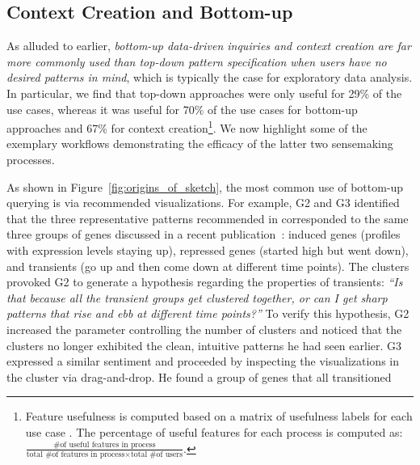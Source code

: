 \subsection{Context Creation and Bottom-up }%
\par As alluded to earlier,
\emph{bottom-up data-driven inquiries
and context creation are far more commonly
used than top-down pattern specification
when users have no desired patterns in mind},
which is typically the case for exploratory data analysis.
In particular, we find that top-down approaches
were only useful for 29\% of the use cases,
whereas it was useful for 70\% of the use cases
for bottom-up approaches and 67\%
for context creation\footnote{Feature usefulness is computed based on a matrix of usefulness labels for each use case . The percentage of useful features for each process is computed as: $\frac{\textrm{\# of useful features in process}}{\textrm{total \# of features in process} \times \textrm{total \# of users}}$.}. We now highlight some of the exemplary workflows demonstrating the efficacy of the latter two sensemaking processes.
\par As shown in Figure~\ref{fig:origins_of_sketch},
the most common use of bottom-up querying
is via recommended visualizations. For example, G2 and G3 identified that
the three representative patterns
recommended in \zvpp corresponded
to the same three groups of genes discussed
in a recent publication~\cite{Gloss2017}:
induced genes (profiles with expression levels staying up),
repressed genes (started high but went down),
and transients (go up and then come down at different time points). The clusters provoked G2 to generate a hypothesis
regarding the properties of transients:
\textit{``Is that because all the transient groups
get clustered together, or can I get sharp patterns
that rise and ebb at different time points?''}
To verify this hypothesis, G2 increased the parameter controlling the number of clusters and noticed that the clusters
no longer exhibited the clean,
intuitive patterns he had seen earlier.
G3 expressed a similar sentiment and proceeded
by inspecting the visualizations
in the cluster via drag-and-drop.
He found a group of genes that all transitioned
